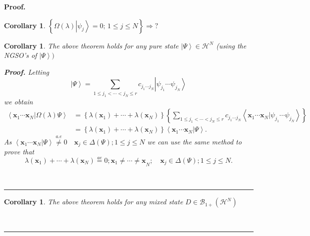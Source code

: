 \documentclass[aps,preprint]{revtex4}%
\newtheorem{corollary}[theorem]{Corollary}
\newenvironment{proof}[1][Proof]{\noindent\textbf{#1.} }{\ \rule{0.5em}{0.5em}}
\begin{document}
\begin{proof}
\begin{corollary}
$\left\{  \Omega\left(  \lambda\right)  \left\vert \psi_{j}\right\rangle
=0;\,1\leq j\leq N\right\}  \Rightarrow?$
\end{corollary}

\begin{corollary}
The above theorem holds for any pure state $\left\vert \Psi\right\rangle
\in\mathcal{H}^{N}$ (using the NGSO's of $\left\vert \Psi\right\rangle )$

\begin{proof}
Letting
\begin{equation}
\left\vert \Psi\right\rangle =\sum_{1\leq j_{1}<\cdots<j_{N}\leq r}%
c_{j_{1}\cdots j_{N}}\left\vert \psi_{j_{1}}\cdots\psi_{j_{N}}\right\rangle
\end{equation}
we obtain
\begin{align}
\left\langle \left.  \mathbf{x}_{1}\cdots\mathbf{x}_{N}\right\vert
\Omega\left(  \lambda\right)  \Psi\right\rangle  &  =\left\{  \lambda\left(
\mathbf{x}_{1}\right)  +\cdots+\lambda\left(  \mathbf{x}_{N}\right)  \right\}
\left\{  \sum_{1\leq j_{1}<\cdots<j_{N}\leq r}c_{j_{1}\cdots j_{N}%
}\left\langle \left.  \mathbf{x}_{1}\cdots\mathbf{x}_{N}\right\vert
\psi_{j_{1}}\cdots\psi_{j_{N}}\right\rangle \right\} \nonumber\\
&  =\left\{  \lambda\left(  \mathbf{x}_{1}\right)  +\cdots+\lambda\left(
\mathbf{x}_{N}\right)  \right\}  \left\langle \left.  \mathbf{x}_{1}%
\cdots\mathbf{x}_{N}\right\vert \Psi\right\rangle .
\end{align}
As $\left\langle \left.  \mathbf{x}_{1}\cdots\mathbf{x}_{N}\right\vert
\Psi\right\rangle \overset{a.e}{\neq}0\quad\mathbf{x}_{j}\in\Delta\left(
\Psi\right)  \mathbf{;}1\mathbf{\leq}j\leq N$ we can use the same method to
prove that
\begin{equation}
\lambda\left(  \mathbf{x}_{1}\right)  +\cdots+\lambda\left(  \mathbf{x}%
_{N}\right)  \overset{ae}{=}0;\mathbf{x}_{1}\mathbf{\neq\cdots\neq x}%
_{N};\quad\mathbf{x}_{j}\in\Delta\left(  \Psi\right)  \mathbf{;}1\mathbf{\leq
}j\leq N.
\end{equation}

\end{proof}
\end{corollary}

\begin{corollary}
The above theorem holds for any mixed state $D\in\mathcal{B}_{1+}\left(
\mathcal{H}^{N}\right)  $


\end{corollary}
\end{proof}
\end{document}
